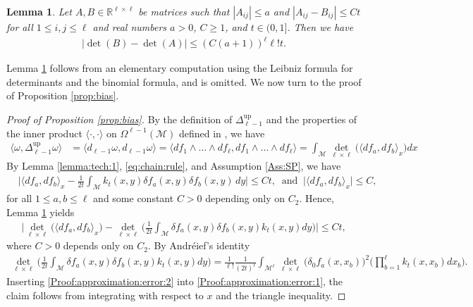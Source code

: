 \documentclass[10pt]{article}
\DeclareMathOperator{\up}{up}
\theoremstyle{plain}
\newtheorem{lemma}{Lemma}
\theoremstyle{definition}
\theoremstyle{remark}
\begin{document}
\begin{lemma}\label{lemma:tech:2}
    Let $A,B\in\mathbb{R}^{\ell\times\ell}$ be matrices such that $|A_{ij}|\leq a$ and $|A_{ij}-B_{ij}|\leq Ct$ for all $1\leq i,j\leq \ell$ and real numbers $a>0$, $C\geq 1$, and $t\in(0,1]$. Then we have 
    \begin{align*}
        \big|\det(B)-\det(A)\big|\leq (C(a+1))^\ell\ell!t.
    \end{align*}
\end{lemma}

Lemma \ref{lemma:tech:2} follows from an elementary computation using the Leibniz formula for determinants and the binomial formula, and is omitted. We now turn to the proof of Proposition \ref{prop:bias}.


\begin{proof}[Proof of Proposition \ref{prop:bias}]
    By the definition of $\Delta_{\ell-1}^{\up}$ and the properties of the inner product $\langle\cdot,\cdot\rangle$ on $\Omega^{\ell-1}(\mathcal{M})$ defined in , we have
    \begin{align*}
        \langle\omega,\Delta_{\ell-1}^{\up}\omega\rangle&=\langle d_{\ell-1}\omega,d_{\ell-1}\omega\rangle=\langle df_1\wedge\dots\wedge df_\ell,df_1\wedge\dots\wedge df_\ell\rangle=\int_{\mathcal{M}}\det_{\ell\times\ell}\big(\langle df_a,df_b\rangle_x\big)dx
    \end{align*}
    By Lemma \ref{lemma:tech:1}, \eqref{eq:chain:rule}, and Assumption \ref{Ass:SP}, we have 
    \begin{align*}
            &\Big|\langle df_a,df_b\rangle_x- \frac{1}{2t}\int_\mathcal{M}k_t(x,y)\delta f_a(x,y)\delta f_b(x,y)\,dy\Big|\leq Ct, \ \text{ and }\ \big|\langle df_a,df_b\rangle_x\big|\leq C,
    \end{align*}
    for all $1\leq a,b\leq \ell$ and some constant $C>0$ depending only on $C_2$. Hence, Lemma \ref{lemma:tech:2}
 yields
 \begin{align}\label{Proof:approximation:error:1}
     \Big|\det_{\ell\times \ell}\big(\langle df_a,df_b\rangle_x\big)-\det_{\ell\times \ell}\Big(\frac{1}{2t}\int_\mathcal{M}\delta f_a(x,y)\delta f_b(x,y)k_t(x,y) dy\Big)\Big|\leq Ct,
 \end{align}
 where $C>0$ depends only on $C_2$. By Andréief's identity 
 \begin{align}\label{Proof:approximation:error:2}
     \det_{\ell\times \ell}\Big(\frac{1}{2t}\int_\mathcal{M}\delta f_a(x,y)\delta f_b(x,y)k_t(x,y)dy\Big)=\frac{1}{\ell !}\frac{1}{(2t)^\ell}\int_{\mathcal{M}^\ell}\det_{\ell\times\ell}\big( \delta_0f_a(x,x_b)\big)^2\Big(\prod_{b=1}^\ell k_t(x,x_b)dx_b\Big).
 \end{align}
 Inserting \eqref{Proof:approximation:error:2} into \eqref{Proof:approximation:error:1}, the claim follows from integrating with respect to $x$ and the triangle inequality.
 \end{proof}
\end{document}
